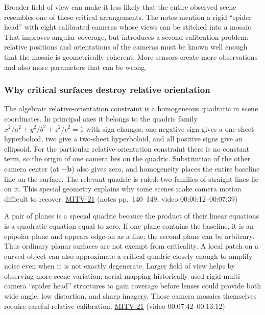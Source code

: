 Broader field of view can make it less likely that the entire observed scene resembles one of these critical arrangements. The notes mention a rigid ``spider head'' with eight calibrated cameras whose views can be stitched into a mosaic. That improves angular coverage, but introduces a second calibration problem: relative positions and orientations of the cameras must be known well enough that the mosaic is geometrically coherent. More sensors create more observations and also more parameters that can be wrong.

\subsubsection{Why critical surfaces destroy relative orientation}\label{why-critical-surfaces-destroy-relative-orientation}

The algebraic relative-orientation constraint is a homogeneous quadratic in scene coordinates. In principal axes it belongs to the quadric family \(x^2/a^2+y^2/b^2+z^2/c^2=1\) with sign changes; one negative sign gives a one-sheet hyperboloid, two give a two-sheet hyperboloid, and all positive signs give an ellipsoid. For the particular relative-orientation constraint there is no constant term, so the origin of one camera lies on the quadric. Substitution of the other camera center (at \(-\mathbf{b}\)) also gives zero, and homogeneity places the entire baseline line on the surface. The relevant quadric is ruled: two families of straight lines lie on it. This special geometry explains why some scenes make camera motion difficult to recover. \hyperref[04-visual-computing-ii-ch036]{MITV-21} (notes pp.~140--149; video 00:00:12--00:07:39)

A pair of planes is a special quadric because the product of their linear equations is a quadratic equation equal to zero. If one plane contains the baseline, it is an epipolar plane and appears edge-on as a line; the second plane can be arbitrary. Thus ordinary planar surfaces are not exempt from criticality. A local patch on a curved object can also approximate a critical quadric closely enough to amplify noise even when it is not exactly degenerate. Larger field of view helps by observing more scene variation; aerial mapping historically used rigid multi-camera ``spider head'' structures to gain coverage before lenses could provide both wide angle, low distortion, and sharp imagery. Those camera mosaics themselves require careful relative calibration. \hyperref[04-visual-computing-ii-ch036]{MITV-21} (video 00:07:42--00:13:12)


